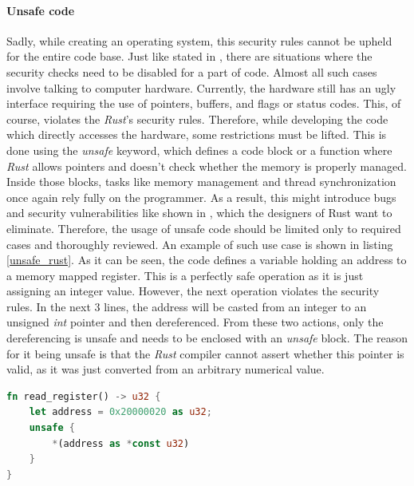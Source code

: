 \paragraph{Unsafe code}
Sadly, while creating an operating system, this security rules cannot be upheld for the entire code base. Just like stated in \cite{rusthowunsafe}, there are situations where the security checks need to be disabled for a part of code. Almost all such cases involve talking to computer hardware. Currently, the hardware still has an ugly interface requiring the use of pointers, buffers, and flags or status codes. This, of course, violates the \textit{Rust}'s security rules. Therefore, while developing the code which directly accesses the hardware, some restrictions must be lifted. This is done using the \textit{unsafe} keyword, which defines a code block or a function where \textit{Rust} allows pointers and doesn't check whether the memory is properly managed. Inside those blocks, tasks like memory management and thread synchronization once again rely fully on the programmer. As a result, this might introduce bugs and security vulnerabilities like shown in \cite{rustunsafeissues}, which the designers of Rust want to eliminate. Therefore, the usage of unsafe code should be limited only to required cases and thoroughly reviewed. An example of such use case is shown in listing \ref{unsafe_rust}. As it can be seen, the code defines a variable holding an address to a memory mapped register. This is a perfectly safe operation as it is just assigning an integer value. However, the next operation violates the security rules. In the next 3 lines, the address will be casted from an integer to an unsigned \textit{int} pointer and then dereferenced. From these two actions, only the dereferencing is unsafe and needs to be enclosed with an \textit{unsafe} block. The reason for it being unsafe is that the \textit{Rust} compiler cannot assert whether this pointer is valid, as it was just converted from an arbitrary numerical value. 

\begin{minipage}{.9\textwidth}
    \begin{lstlisting}[language=rust,caption={Unsafe code example.},captionpos=b,label={unsafe_rust}]
fn read_register() -> u32 {
    let address = 0x20000020 as u32;
    unsafe {
        *(address as *const u32)
    }
}        
    \end{lstlisting}    
\end{minipage}

